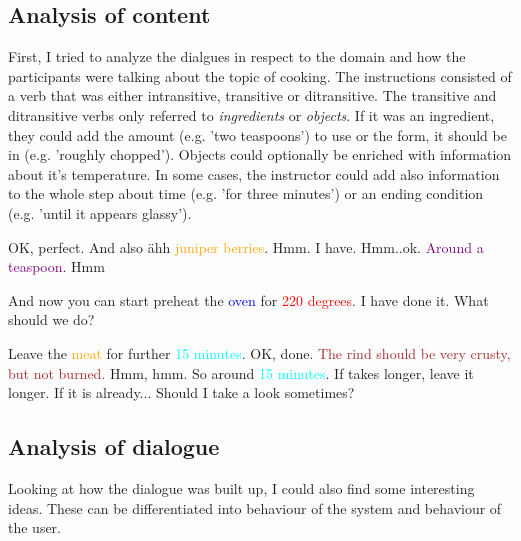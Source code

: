 \documentclass[
	11pt, %
]{fphw}
\newenvironment{mydialogue}
    {\begin{tcolorbox}[colback=color_background]\begin{dialogue}}
    {\end{dialogue}\end{tcolorbox}}
\begin{document}
\subsection*{Analysis of content}
First, I tried to analyze the dialgues in respect to the domain and how the participants were talking about the topic of cooking. The instructions consisted of a verb that was either intransitive, transitive or ditransitive. The transitive and ditransitive verbs only referred to \emph{ingredients} or \emph{objects}. If it was an ingredient, they could add the amount (e.g. 'two teaspoons') to use or the form, it should be in (e.g. 'roughly chopped'). Objects could optionally be enriched with information about it's temperature. 
In some cases, the instructor could add also information to the whole step about time (e.g. 'for three minutes') or an ending condition (e.g. 'until it appears glassy').

\begin{mydialogue}
     OK, perfect. And also ähh \textcolor{orange}{juniper berries}. 
     Hmm. I have.
     Hmm..ok. \textcolor{purple}{Around a teaspoon}.
     Hmm

    \label{dia:ingredient}
\end{mydialogue}

\begin{mydialogue}
	 And now you can start preheat the \textcolor{blue}{oven} for \textcolor{red}{220 degrees}. 
     I have done it. What should we do? 

    \label{dia:object}
\end{mydialogue}

\begin{mydialogue}
     Leave the \textcolor{orange}{meat} for further \textcolor{cyan}{15 minutes}. 
     OK, done.
     \textcolor{brown}{The rind should be very crusty, but not burned.}
     Hmm, hmm.
     So around \textcolor{cyan}{15 minutes}. If takes longer, leave it longer. If it is already...
     Should I take a look sometimes? 

    \label{dia:step}
\end{mydialogue}

\subsection*{Analysis of dialogue}
Looking at how the dialogue was built up, I could also find some interesting ideas. These can be differentiated into behaviour of the system and behaviour of the user.
\end{document}
